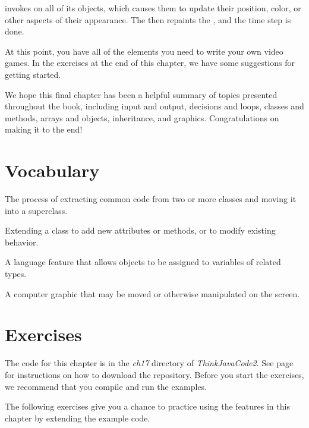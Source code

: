  invokes  on all of its  objects, which causes them to update their position, color, or other aspects of their appearance.
The  then repaints the , and the time step is done.

At this point, you have all of the elements you need to write your own video games.
In the exercises at the end of this chapter, we have some suggestions for getting started.

We hope this final chapter has been a helpful summary of topics presented throughout the book, including input and output, decisions and loops, classes and methods, arrays and objects, inheritance, and graphics.
Congratulations on making it to the end!


\section{Vocabulary}

\begin{description}

The process of extracting common code from two or more classes and moving it into a superclass.

Extending a class to add new attributes or methods, or to modify existing behavior.

A language feature that allows objects to be assigned to variables of related types.

A computer graphic that may be moved or otherwise manipulated on the screen.

\end{description}


\section{Exercises}


The code for this chapter is in the {\it ch17} directory of {\it ThinkJavaCode2}.
See page~\pageref{code} for instructions on how to download the repository.
Before you start the exercises, we recommend that you compile and run the examples.

The following exercises give you a chance to practice using the features in this chapter by extending the example code.


